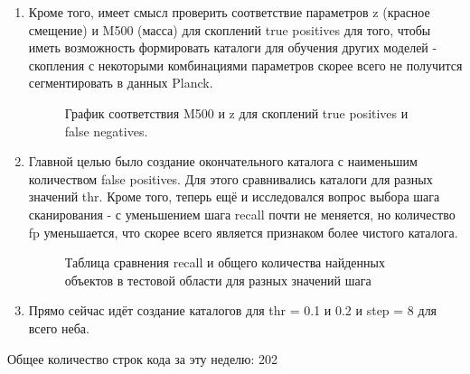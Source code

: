 \documentclass{article}
\begin{document}
\begin{enumerate}
    \item Кроме того, имеет смысл проверить соответствие параметров z (красное смещение) и M500 
        (масса) для скоплений true positives для того, чтобы иметь возможность формировать каталоги 
        для обучения других моделей - скопления с некоторыми комбинациями параметров скорее всего не 
        получится сегментировать в данных Planck.\\

    \begin{figure}[h]
        \caption{График соответствия M500 и z для скоплений true positives и false negatives.}
    \end{figure}

    \item Главной целью было создание окончательного каталога с наименьшим количеством false 
        positives. Для этого сравнивались каталоги для разных значений thr. Кроме того, теперь 
        ещё и исследовался вопрос выбора шага сканирования - с уменьшением шага recall почти не 
        меняется, но количество fp уменьшается, что скорее всего является признаком более чистого 
        каталога.\\

    
    \begin{figure}[h]
        \caption{Таблица сравнения recall и общего количества найденных объектов в тестовой области
        для разных значений шага}
    \end{figure}

    \item Прямо сейчас идёт создание каталогов для thr = 0.1 и 0.2 и step = 8 для всего неба.\\ 

\end{enumerate}

Общее количество строк кода за эту неделю: 202\\
\end{document}
